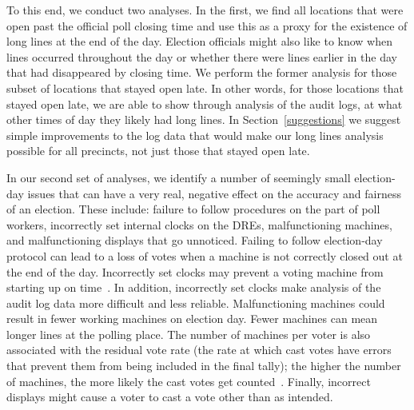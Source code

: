 \documentclass[letterpaper,twocolumn,10pt]{article}
\begin{document}
To this end, we conduct two analyses. In the first, we find all
locations that were open past the official poll closing time and use this as a
proxy for the existence of long lines at the end of the day. Election officials
might also like to know when lines occurred throughout the day or whether there
were lines earlier in the day that had disappeared by closing time. We perform
the former 
analysis for those subset of locations that stayed open late. In other words,
for those locations that stayed open late, we are able to show through analysis
of the audit logs, at what other times of day they likely had long
lines. In Section~\ref{suggestions} we suggest simple improvements to the log
data that would make our long lines analysis possible for all precincts, not
just those that stayed open late.


In our second set of analyses, we identify a number of seemingly small
election-day issues that can have a very real, negative effect on the accuracy
and fairness of an election. These include:
failure to follow procedures on the part of poll workers, incorrectly set
internal clocks on the DREs, malfunctioning machines, and malfunctioning
displays that go unnoticed.  
Failing to follow election-day protocol can lead to a loss of votes when a
machine is not correctly closed out at the end of the day. Incorrectly set
clocks may prevent a voting machine from starting up on
time~\cite{VotUn2007}. In addition, incorrectly set clocks make analysis of the
audit log data more difficult and less reliable. Malfunctioning machines could
result in fewer working machines on election day. Fewer machines can mean longer
lines at the polling place. The number of machines per voter is also associated
with the residual vote rate (the rate at which cast votes have errors that
prevent them from being included in the final tally); the higher the number of
machines, the more likely the cast votes get counted~\cite{DNC2005}. Finally,
incorrect displays might cause a voter to cast a vote other than as intended.
 
\end{document}
